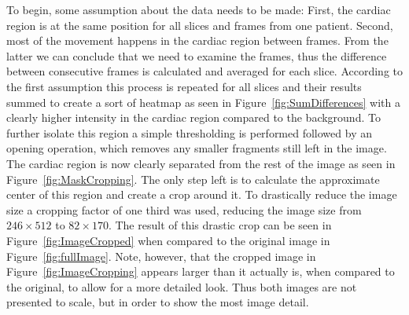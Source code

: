 \documentclass[english,version-2022-01]{uzl-thesis} %
\begin{document}
To begin, some assumption about the data needs to be made: First, the cardiac region is at the same position for all slices and frames from one patient. Second, most of the movement happens in the cardiac region between frames. From the latter we can conclude that we need to examine the frames, thus the difference between consecutive frames is calculated and averaged for each slice. According to the first assumption this process is repeated for all slices and their results summed to create a sort of heatmap as seen in Figure~\ref{fig:SumDifferences} with a clearly higher intensity in the cardiac region compared to the background. To further isolate this region a simple thresholding is performed followed by an opening operation, which removes any smaller fragments still left in the image. The cardiac region is now clearly separated from the rest of the image as seen in Figure~\ref{fig:MaskCropping}. The only step left is to calculate the approximate center of this region and create a crop around it. To drastically reduce the image size a cropping factor of one third was used, reducing the image size from $246 \times 512$ to $82 \times 170$. The result of this drastic crop can be seen in Figure~\ref{fig:ImageCropped} when compared to the original image in Figure~\ref{fig:fullImage}. Note, however, that the cropped image in Figure~\ref{fig:ImageCropping} appears larger than it actually is, when compared to the original, to allow for a more detailed look. Thus both images are not presented to scale, but in order to show the most image detail.
\end{document}
